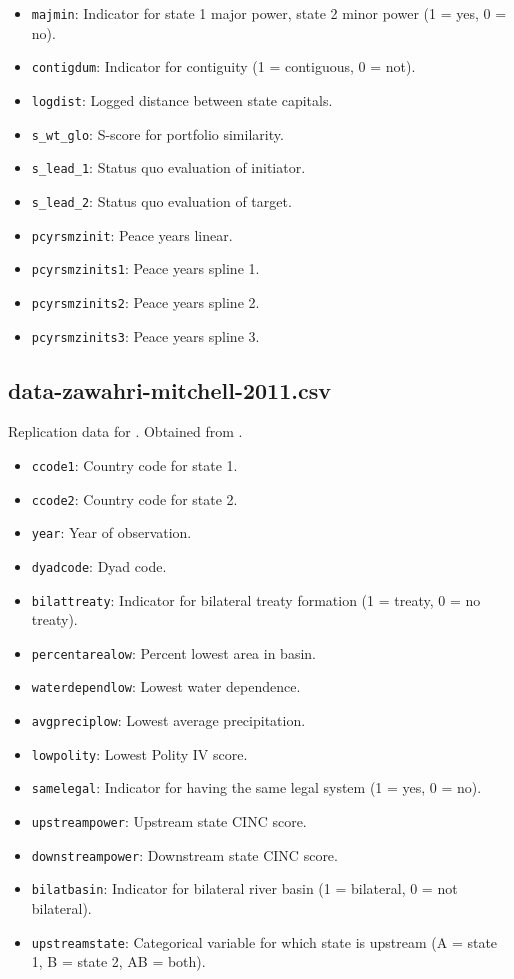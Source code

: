 \documentclass[12pt]{article}
\begin{document}
\begin{itemize}
  \item \texttt{majmin}: Indicator for state 1 major power, state 2 minor power (1 = yes, 0 = no).
  \item \texttt{contigdum}: Indicator for contiguity (1 = contiguous, 0 = not).
  \item \texttt{logdist}: Logged distance between state capitals.
  \item \texttt{s\_wt\_glo}: S-score for portfolio similarity.
  \item \texttt{s\_lead\_1}: Status quo evaluation of initiator.
  \item \texttt{s\_lead\_2}: Status quo evaluation of target.
  \item \texttt{pcyrsmzinit}: Peace years linear.
  \item \texttt{pcyrsmzinits1}: Peace years spline 1.
  \item \texttt{pcyrsmzinits2}: Peace years spline 2.
  \item \texttt{pcyrsmzinits3}: Peace years spline 3.
\end{itemize}


\subsection{data-zawahri-mitchell-2011.csv}

Replication data for \citet{Zawahri:2011iy}.
Obtained from \citet{zawahri2011data}.

\begin{itemize}
  \item \texttt{ccode1}: Country code for state 1.
  \item \texttt{ccode2}: Country code for state 2.
  \item \texttt{year}: Year of observation.
  \item \texttt{dyadcode}: Dyad code.
  \item \texttt{bilattreaty}: Indicator for bilateral treaty formation (1 = treaty, 0 = no treaty).
  \item \texttt{percentarealow}: Percent lowest area in basin.
  \item \texttt{waterdependlow}: Lowest water dependence.
  \item \texttt{avgpreciplow}: Lowest average precipitation.
  \item \texttt{lowpolity}: Lowest Polity IV score.
  \item \texttt{samelegal}: Indicator for having the same legal system (1 = yes, 0 = no).
  \item \texttt{upstreampower}: Upstream state CINC score.
  \item \texttt{downstreampower}: Downstream state CINC score.
  \item \texttt{bilatbasin}: Indicator for bilateral river basin (1 = bilateral, 0 = not bilateral).
  \item \texttt{upstreamstate}: Categorical variable for which state is upstream (A = state 1, B = state 2, AB = both).
\end{itemize}
\end{document}
